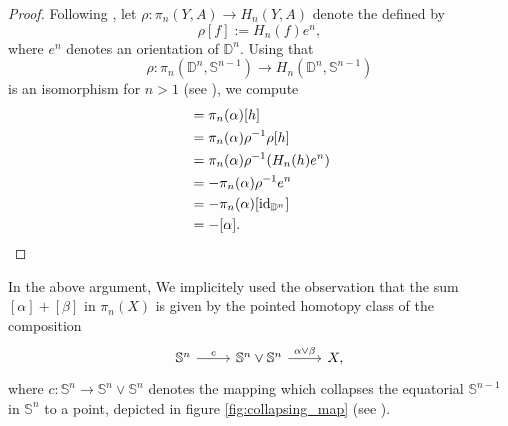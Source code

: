 \begin{proof}
 	Following \cite[166]{whitehead:homotopy_theory:1978}, let $\rho : \pi_n(Y,A) \to H_n(Y,A)$ denote the  defined by
	\begin{equation*}
		\rho[f] := H_n(f)e^n,
	\end{equation*}
	\noindent where $e^n$ denotes an orientation of $\mathbb{D}^n$. Using that 
	\begin{equation*}
		\rho : \pi_n(\mathbb{D}^n,\mathbb{S}^{n - 1}) \to H_n(\mathbb{D}^n,\mathbb{S}^{n - 1})
	\end{equation*}
	\noindent is an isomorphism for $n > 1$ (see \cite[168]{whitehead:homotopy_theory:1978}), we compute
	\begin{align*}
		[\alpha \circ h] &= \pi_n(\alpha)[h]\\
		&= \pi_n(\alpha)\rho^{-1}\rho[h]\\ 
		&= \pi_n(\alpha)\rho^{-1}(H_n(h)e^n)\\
		&= -\pi_n(\alpha)\rho^{-1}e^n\\
		&= -\pi_n(\alpha)[\id_{\mathbb{D}^n}]\\
		&= - [\alpha].
	\end{align*}
\end{proof}

In the above argument, We implicitely used the observation that the sum $[\alpha] + [\beta]$ in $\pi_n(X)$ is given by the pointed homotopy class of the composition
\begin{equation*}
	\begin{tikzcd}
		\mathbb{S}^n \arrow[r,"c"] & \mathbb{S}^n \vee \mathbb{S}^n \arrow[r,"\alpha \vee \beta"] & X,
	\end{tikzcd}
\end{equation*}
\noindent where $c : \mathbb{S}^n \to \mathbb{S}^n \vee \mathbb{S}^n$ denotes the mapping which collapses the equatorial $\mathbb{S}^{n - 1}$ in $\mathbb{S}^n$ to a point, depicted in figure \ref{fig:collapsing_map} (see \cite[341]{hatcher:algebraic_topology:2001}).

